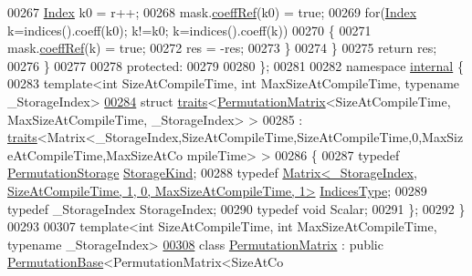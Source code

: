 \begin{DoxyCode}
00267         \hyperlink{group___core___module_a554f30542cc2316add4b1ea0a492ff02}{Index} k0 = r++;
00268         mask.\hyperlink{class_eigen_1_1_plain_object_base_a25626a55b26a4323565f79d1b7c48ea8}{coeffRef}(k0) = \textcolor{keyword}{true};
00269         \textcolor{keywordflow}{for}(\hyperlink{group___core___module_a554f30542cc2316add4b1ea0a492ff02}{Index} k=indices().coeff(k0); k!=k0; k=indices().coeff(k))
00270         \{
00271           mask.\hyperlink{class_eigen_1_1_plain_object_base_a25626a55b26a4323565f79d1b7c48ea8}{coeffRef}(k) = \textcolor{keyword}{true};
00272           res = -res;
00273         \}
00274       \}
00275       \textcolor{keywordflow}{return} res;
00276     \}
00277 
00278   \textcolor{keyword}{protected}:
00279 
00280 \};
00281 
00282 \textcolor{keyword}{namespace }\hyperlink{namespaceinternal}{internal} \{
00283 \textcolor{keyword}{template}<\textcolor{keywordtype}{int} SizeAtCompileTime, \textcolor{keywordtype}{int} MaxSizeAtCompileTime, \textcolor{keyword}{typename} \_StorageIndex>
\hyperlink{struct_eigen_1_1internal_1_1traits_3_01_permutation_matrix_3_01_size_at_compile_time_00_01_max_sd0808d93099012556270f7c7cd36fcc5}{00284} \textcolor{keyword}{struct }\hyperlink{struct_eigen_1_1internal_1_1traits}{traits}<\hyperlink{group___core___module_class_eigen_1_1_permutation_matrix}{PermutationMatrix}<SizeAtCompileTime, MaxSizeAtCompileTime, 
      \_StorageIndex> >
00285  : \hyperlink{struct_eigen_1_1internal_1_1traits}{traits}<Matrix<\_StorageIndex,SizeAtCompileTime,SizeAtCompileTime,0,MaxSizeAtCompileTime,MaxSizeAtCo
      mpileTime> >
00286 \{
00287   \textcolor{keyword}{typedef} \hyperlink{struct_eigen_1_1_permutation_storage}{PermutationStorage} \hyperlink{struct_eigen_1_1_permutation_storage}{StorageKind};
00288   \textcolor{keyword}{typedef} 
      \hyperlink{group___core___module_class_eigen_1_1_matrix}{Matrix<\_StorageIndex, SizeAtCompileTime, 1, 0, MaxSizeAtCompileTime, 1>}
       \hyperlink{group___core___module_class_eigen_1_1_matrix}{IndicesType};
00289   \textcolor{keyword}{typedef} \_StorageIndex StorageIndex;
00290   \textcolor{keyword}{typedef} \textcolor{keywordtype}{void} Scalar;
00291 \};
00292 \}
00293 
00307 \textcolor{keyword}{template}<\textcolor{keywordtype}{int} SizeAtCompileTime, \textcolor{keywordtype}{int} MaxSizeAtCompileTime, \textcolor{keyword}{typename} \_StorageIndex>
\hyperlink{group___core___module}{00308} \textcolor{keyword}{class }\hyperlink{group___core___module_class_eigen_1_1_permutation_matrix}{PermutationMatrix} : \textcolor{keyword}{public} \hyperlink{group___core___module_class_eigen_1_1_permutation_base}{PermutationBase}<PermutationMatrix<SizeAtCo

\end{DoxyCode}
